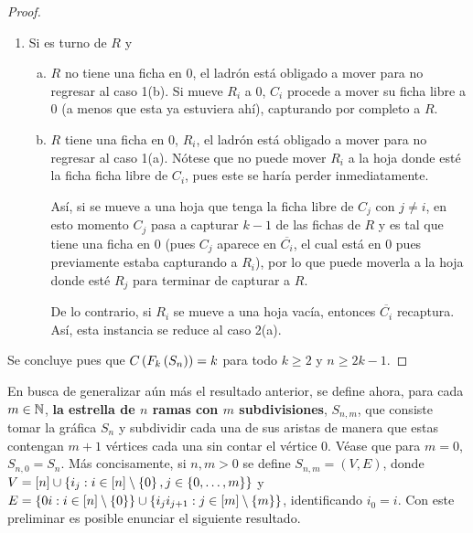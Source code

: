 \begin{proof}
\begin{enumerate}
        \item Si es turno de $R$ y
        \begin{enumerate}[(a)]
            \item $R$ no tiene una ficha en $0$, el ladr\'on est\'a obligado a
            mover para no regresar al caso 1(b). Si mueve $R_i$ a $0$, $C_i$
            procede a mover su ficha libre a $0$ (a menos que esta ya estuviera
            ah\'i), capturando por completo a $R$.
            
            \item $R$ tiene una ficha en $0$, $R_i$, el ladr\'on est\'a obligado
            a mover para no regresar al caso 1(a). N\'otese que no puede mover
            $R_i$ a la hoja donde est\'e la ficha ficha libre de $C_i$, pues
            este se har\'ia perder inmediatamente.
            
            As\'i, si se mueve a una hoja que tenga la ficha libre de $C_j$ con
            $j\neq i$, en esto momento $C_j$ pasa a capturar $k-1$ de las fichas
            de $R$ y es tal que tiene una ficha en $0$ (pues $C_j$ aparece en
            $\overline{C_i}$, el cual est\'a en $0$ pues previamente estaba
            capturando a $R_i$), por lo que puede moverla a la hoja donde est\'e
            $R_j$ para terminar de capturar a $R$.

            De lo contrario, si $R_i$ se mueve a una hoja vac\'ia, entonces
            $\overline{C_i}$ recaptura. As\'i, esta instancia se reduce al caso
            2(a).
        \end{enumerate}
    \end{enumerate}
    Se concluye pues que $C\left( F_k\left( S_n\right)\right)=k$ para todo $k\geq 2$ y $n\geq 2k-1$.
    
    
\end{proof}

En busca de generalizar a\'un m\'as el resultado anterior, se define ahora, para
cada $m\in \mathbb{N}$, \textbf{la estrella de $n$ ramas con $m$ subdivisiones},
$S_{n,m}$, que consiste tomar la gr\'afica $S_n$ y subdividir cada una de sus
aristas de manera que estas contengan $m+1$ v\'ertices cada una sin contar el
v\'ertice $0$. V\'ease que para $m=0$, $S_{n,0}=S_n$. M\'as concisamente, si
$n,m > 0$ se define $S_{n,m}=(V,E)$, donde $V=\left[ n\right]\cup\left\{ i_j: i\in
\left[ n\right]\setminus \left\{ 0\right\} , j\in \left\{ 0,\dots, m\right\}\right\}$ y $E=\left\{ 0i : i\in \left[ n\right]\setminus
\left\{ 0\right\}\right\} \cup \left\{ i_ji_{j+1}:j\in\left[ m\right]\setminus\left\{ m\right\}\right\}$, identificando $i_0=i$. Con
este preliminar es posible enunciar el siguiente resultado.

